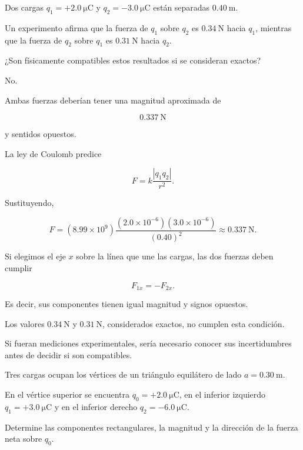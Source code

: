 \begin{ejercicio}
Dos cargas \(q_1=+\SI{2.0}{\micro\coulomb}\) y
\(q_2=-\SI{3.0}{\micro\coulomb}\) están separadas
\(\SI{0.40}{\metre}\).

Un experimento afirma que la fuerza de \(q_1\) sobre \(q_2\) es
\(\SI{0.34}{\newton}\) hacia \(q_1\), mientras que la fuerza de \(q_2\)
sobre \(q_1\) es \(\SI{0.31}{\newton}\) hacia \(q_2\).

¿Son físicamente compatibles estos resultados si se consideran exactos?
\end{ejercicio}

\begin{respuesta}
No.

Ambas fuerzas deberían tener una magnitud aproximada de

\[
\boxed{\SI{0.337}{\newton}}
\]

y sentidos opuestos.
\end{respuesta}

\begin{explicacion}
La ley de Coulomb predice

\[
F=k\frac{|q_1q_2|}{r^2}.
\]

Sustituyendo,

\[
F=(8.99\times10^9)
\frac{(2.0\times10^{-6})(3.0\times10^{-6})}{(0.40)^2}
\approx\SI{0.337}{\newton}.
\]

Si elegimos el eje \(x\) sobre la línea que une las cargas, las dos fuerzas
deben cumplir

\[
F_{1x}=-F_{2x}.
\]

Es decir, sus componentes tienen igual magnitud y signos opuestos.

Los valores \(\SI{0.34}{\newton}\) y \(\SI{0.31}{\newton}\), considerados
exactos, no cumplen esta condición.

Si fueran mediciones experimentales, sería necesario conocer sus
incertidumbres antes de decidir si son compatibles.
\end{explicacion}


\begin{ejercicio}
Tres cargas ocupan los vértices de un triángulo equilátero de lado
\(a=\SI{0.30}{\metre}\).

En el vértice superior se encuentra \(q_0=+\SI{2.0}{\micro\coulomb}\), en el
inferior izquierdo \(q_1=+\SI{3.0}{\micro\coulomb}\) y en el inferior
derecho \(q_2=-\SI{6.0}{\micro\coulomb}\).

Determine las componentes rectangulares, la magnitud y la dirección de la
fuerza neta sobre \(q_0\).
\end{ejercicio}

